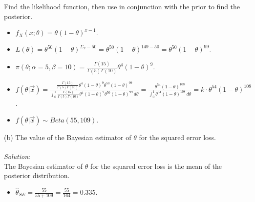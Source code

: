 \documentclass[12pt]{article}
\newcommand{\ds}{\displaystyle}
\begin{document}
\noindent
Find the likelihood function, then use in conjunction with the prior to find the posterior. \\

\begin{itemize}
    \item $ \ds f_X(x ; \theta) = \theta (1 - \theta)^{x - 1} $. \\
    \item $ \ds L(\theta) = \theta^{50} (1 - \theta)^{\Sigma_{x} - 50} = \theta^{50} (1 - \theta)^{149 - 50} = \theta^{50} (1 - \theta)^{99} $. \\
    \item $ \ds \pi(\theta ; \alpha = 5, \beta = 10) = \frac{ \Gamma(15) }{ \Gamma(5)\Gamma(10) } \theta^{4} (1 - \theta)^{9} $. \\
    \item $ \ds f(\theta | \overrightarrow{x}) = \frac{ \ds \frac{ \Gamma(15) }{ \Gamma(5)\Gamma(10) } \theta^{4} (1 - \theta)^{9} \theta^{50} (1 - \theta)^{99} }{ \ds\int_{0}^{1} \frac{ \Gamma(15) }{ \Gamma(5)\Gamma(10) } \theta^{4} (1 - \theta)^{9} \theta^{50} (1 - \theta)^{99} \, d\theta } =
    \frac{ \ds \theta^{54} (1 - \theta)^{108} }{ \ds\int_{0}^{1} \theta^{54} (1 - \theta)^{108} \, d\theta } = k \cdot \theta^{54} (1 - \theta)^{108}$. \\
    \item $ \ds f(\theta | \overrightarrow{x}) \sim Beta(55, 109) $. \\
\end{itemize}

\vspace{2.5mm}

\newpage

(b) The value of the Bayesian estimator of $ \theta $ for the squared error loss. \\
\vspace{2.5mm} \\
\textit{Solution}:
\vspace{2.5mm} \\

\noindent
The Bayesian estimator of $ \theta $ for the squared error loss is the mean of the posterior distribution. \\

\begin{itemize}
    \item $ \ds \hat{\theta}_{SE} = \frac{55}{55 + 109} = \frac{55}{164} = 0.335 $.
\end{itemize}
\end{document}
